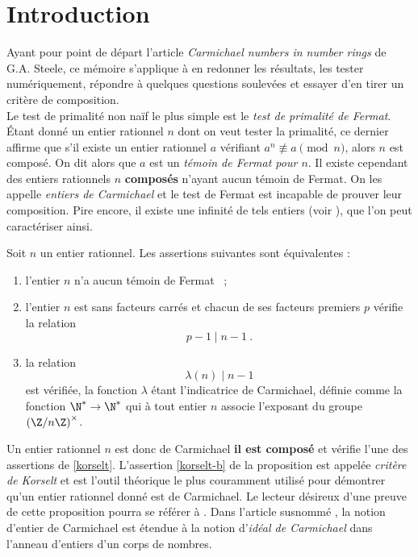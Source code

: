 \section*{Introduction}

Ayant pour point de départ l'article \textit{Carmichael numbers in number rings} \cite{article} de G.A. Steele, ce mémoire s'applique à en redonner les résultats, les tester numériquement, répondre à quelques questions soulevées et essayer d'en tirer un critère de composition. \\

Le test de primalité non naïf le plus simple est le \emph{test de primalité de Fermat}. Étant donné un entier rationnel $n$ dont on veut tester la primalité, ce dernier affirme que s'il existe un entier rationnel $a$ vérifiant $a^n \not \equiv a \pmod{n}$, alors $n$ est composé. On dit alors que $a$ est un \emph{témoin de Fermat pour $n$}. Il existe cependant des entiers rationnels $n$ \textbf{composés} n'ayant aucun témoin de Fermat. On les appelle \emph{entiers de Carmichael} et le test de Fermat est incapable de prouver leur composition. Pire encore, il existe une infinité de tels entiers (voir \cite{InfiniteCarmichael}), que l'on peut caractériser ainsi.

\begin{proposition}\label{korselt} Soit $n$ un entier rationnel. Les assertions suivantes sont équivalentes :
	\begin{enumerate}[font=\normalshape]
		\item l'entier $n$ n'a aucun témoin de Fermat ~;
		\item l'entier $n$ est sans facteurs carrés et chacun de ses facteurs premiers $p$ vérifie la relation \[p-1 \mid n-1 ~.\] \label{korselt-b}
		\item la relation \[\lambda(n) \mid n-1\] est vérifiée, la fonction $\lambda$ étant l'indicatrice de Carmichael, définie comme la fonction $\N^* \to \N^*$ qui à tout entier $n$ associe l'exposant du groupe $\left(\Z/n\Z\right)^\times$.
	\end{enumerate}
\end{proposition}

Un entier rationnel $n$ est donc de Carmichael \ssi \textbf{il est composé} et vérifie l'une des assertions de \ref{korselt}. L'assertion \ref{korselt-b} de la proposition est appelée \textit{critère de Korselt} et est l'outil théorique le plus couramment utilisé pour démontrer qu'un entier rationnel donné est de Carmichael. Le lecteur désireux d'une preuve de cette proposition pourra se référer à \cite[§3.3 p. 89]{Demazure}. Dans l'article susnommé \cite{article}, la notion d'entier de Carmichael est étendue à la notion d'\emph{idéal de Carmichael} dans l'anneau d'entiers d'un corps de nombres. 

